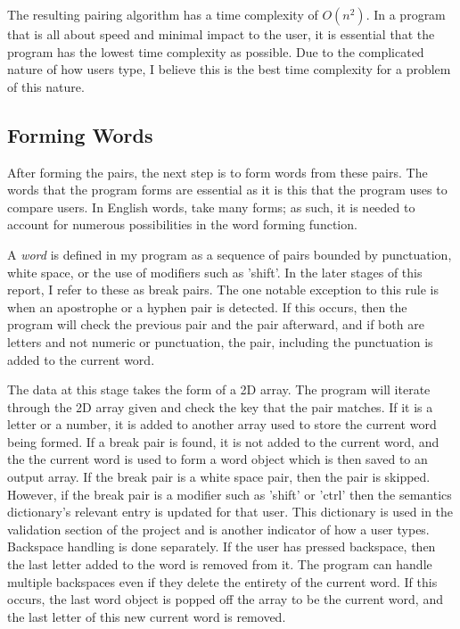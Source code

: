 \documentclass[10pt,a4paper]{report}
\begin{document}
The resulting pairing algorithm has a time complexity of \(O(n^2)\). In a program that is all about speed and minimal impact to the user, it is essential that the program has the lowest time complexity as possible. Due to the complicated nature of how users type, I believe this is the best time complexity for a problem of this nature.

\subsection{Forming Words}

After forming the pairs, the next step is to form words from these pairs. The words that the program forms are essential as it is this that the program uses to compare users. In English words, take many forms; as such, it is needed to account for numerous possibilities in the word forming function.

A \emph{word} is defined in my program as a sequence of pairs bounded by punctuation, white space, or the use of modifiers such as 'shift'. In the later stages of this report, I refer to these as break pairs. The one notable exception to this rule is when an apostrophe or a hyphen pair is detected. If this occurs, then the program will check the previous pair and the pair afterward, and if both are letters and not numeric or punctuation, the pair, including the punctuation is added to the current word. 

The data at this stage takes the form of a 2D array. The program will iterate through the 2D array given and check the key that the pair matches. If it is a letter or a number, it is added to another array used to store the current word being formed. If a break pair is found, it is not added to the current word, and the the current word is used to form a word object which is then saved to an output array. If the break pair is a white space pair, then the pair is skipped. However, if the break pair is a modifier such as 'shift' or 'ctrl' then the semantics dictionary's relevant entry is updated for that user. This dictionary is used in the validation section of the project and is another indicator of how a user types. Backspace handling is done separately. If the user has pressed backspace, then the last letter added to the word is removed from it. The program can handle multiple backspaces even if they delete the entirety of the current word. If this occurs, the last word object is popped off the array to be the current word, and the last letter of this new current word is removed.
\end{document}
